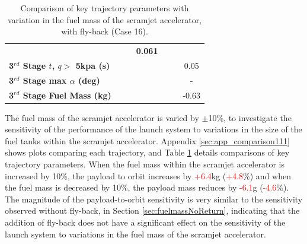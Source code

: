\begin{table}[ht]
\begin{tabular}{l c c c c c c}
	& \textbf{\thirddExergyEffmFuelOneHundredFive}
	& \textbf{\thirddExergyEffmFuelOneHundredTen}
	& \textbf{0.061}
	\\
	\textbf{3$^{rd}$ Stage $t$, $q >$ 5kpa (s)}
	& \thirdqOverFivemFuelNinety
	& \thirdqOverFivemFuelNinetyFive
	& \thirdqOverFivemFuelStandard
	& \thirdqOverFivemFuelOneHundredFive
	& \thirdqOverFivemFuelOneHundredTen
	&0.05
	\\
	\textbf{3$^{rd}$ Stage max $\alpha$ (deg)}
	& \thirdmaxAoAmFuelNinety
	& \thirdmaxAoAmFuelNinetyFive
	& \thirdmaxAoAmFuelStandard
	& \thirdmaxAoAmFuelOneHundredFive
	& \thirdmaxAoAmFuelOneHundredTen
	& -
	\\
	\textbf{3$^{rd}$ Stage Fuel Mass (kg)}
	& \thirdmFuelmFuelNinety
	& \thirdmFuelmFuelNinetyFive
	& \thirdmFuelmFuelStandard
	& \thirdmFuelmFuelOneHundredFive
	& \thirdmFuelmFuelOneHundredTen
	&-0.63
	\\
	\hline 
\end{tabular} 
\caption{Comparison of key trajectory parameters with variation in the fuel mass of the scramjet accelerator, with fly-back (Case 16).}
\label{tab:comparison111}
\end{table}
	
The fuel mass of the scramjet accelerator is varied by $\pm$10\%, to investigate the sensitivity of the performance of the launch system to variations in the size of the fuel tanks within the scramjet accelerator. 
Appendix \ref{sec:app_comparison111} shows plots comparing each trajectory, and Table \ref{tab:comparison111} details comparisons of key trajectory parameters. 
When the fuel mass within the scramjet accelerator is increased by 10\%, the payload to orbit increases by \textcolor{red}{+6.4}kg (\textcolor{red}{+4.8}\%) and when the fuel mass is decreased by 10\%, the payload mass reduces by \textcolor{red}{-6.1}g (\textcolor{red}{-4.6}\%). The magnitude of the payload-to-orbit sensitivity is very similar to the sensitivity observed without fly-back, in Section \ref{sec:fuelmassNoReturn}, indicating that the addition of fly-back does not have a significant effect on the sensitivity of the launch system to variations in the fuel mass of the scramjet accelerator. 

